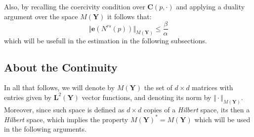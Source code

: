 Also, by recalling the coercivity condition over $\mathbf{C}(p, \cdot)$ and applying a duality argument over the space $M(\mathbf{Y})$ it follows that:
\begin{equation}
    \label{eq:Estimate-Nrs}
    \Vert \mathbf{e}(N^{rs}(p))\Vert_{M(\mathbf{Y})} \leq \frac{\beta}{\alpha}
\end{equation}
which will be usefull in the estimation in the following subsections.
\subsection{About the Continuity}

In all that follows, we will denote by $M(\mathbf{Y})$ the set of $d \times d$ matrices with entries given by $\mathbf{L}^2(\mathbf{Y})$ vector functions, and denoting its norm by $\Vert \cdot \Vert_{M(\mathbf{Y})}$. Moreover, since such space is defined as $d \times d$ copies of a \textit{Hilbert} space, its then a \textit{Hilbert} space, which implies the property $M(\mathbf{Y})^* = M(\mathbf{Y})$ which will be used in the following arguments.

